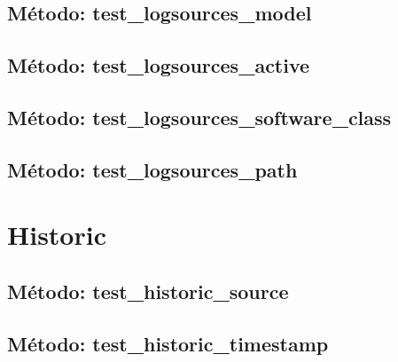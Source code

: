 

\subsection{\quad Método: test\_logsources\_model}



\subsection{\quad Método: test\_logsources\_active}



\subsection{\quad Método: test\_logsources\_software\_class}



\subsection{\quad Método: test\_logsources\_path}



\section{\quad Historic}



\subsection{\quad Método: test\_historic\_source}



\subsection{\quad Método: test\_historic\_timestamp}



